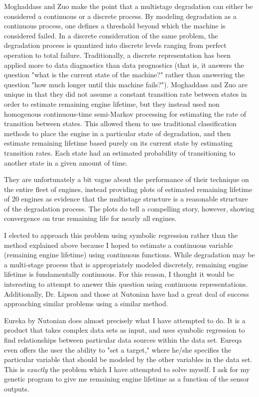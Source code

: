 \documentclass{acm_proc_article-sp}
\begin{document}
Moghaddass and Zuo make the point that a multistage degradation can either be considered a continuous or a discrete process. By modeling degradation as a continuous process, one defines a threshold beyond which the machine is considered failed. In a discrete consideration of the same problem, the degradation process is quantized into discrete levels ranging from perfect operation to total failure. Traditionally, a discrete representation has been applied more to data diagnostics than data prognostics (that is, it answers the question "what is the current state of the machine?" rather than answering the question "how much longer until this machine fails?").  Moghaddass and Zuo are unique in that they did not assume a constant transition rate between states in order to estimate remaining engine lifetime, but they instead used non homogenous continuous-time semi-Markov processing for estimating the rate of transition between states. This allowed them to use traditional classification methods to place the engine in a particular state of degradation, and then estimate remaining lifetime based purely on its current state by estimating transition rates. Each state had an estimated probability of transitioning to another state in a given amount of time. \cite{Mog}

They are unfortunately a bit vague about the performance of their technique on the entire fleet of engines, instead providing plots of estimated remaining lifetime of 20 engines as evidence that the multistage structure is a reasonable structure of the degradation process. The plots do tell a compelling story, however, showing convergence on true remaining life for nearly all engines. \cite{Mog}

I elected to approach this problem using symbolic regression rather than the method explained above because I hoped to estimate a continuous variable (remaining engine lifetime) using continuous functions. While degradation may be a multi-stage process that is appropriately modeled discretely, remaining engine lifetime is fundamentally continuous. For this reason, I thought it would be interesting to attempt to answer this question using continuous representations. Additionally, Dr. Lipson and those at Nutonian have had a great deal of success approaching similar problems using a similar method. \cite{nutonian}

Eureka by Nutonian does almost precisely what I have attempted to do. It is a product that takes complex data sets as input, and uses symbolic regression to find relationships between particular data sources within the data set. Eureqa even offers the user the ability to "set a target," where he/she specifies the particular variable that should be modeled by the other variables in the data set. This is {\it{exactly}} the problem which I have attempted to solve myself. I ask for my genetic program to give me remaining engine lifetime as a function of the sensor outputs. \cite{nutonian}
\end{document}

